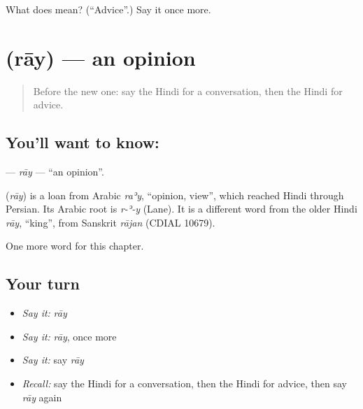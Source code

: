 \begin{tcolorbox}[breakable,colback=teal!4,colframe=teal!35!black,title={Before you move on}]
What does  mean? (\textquotedblleft{}Advice\textquotedblright{}.) Say it once more.
\end{tcolorbox}
\section[\texorpdfstring{\hi{राय} (rāy)}{राय (rāy)}]{ (rāy) — an opinion}

\label{lesson:HI-C206-ray}



\begin{quote}
Before the new one: say the Hindi for a conversation, then the Hindi for advice.
\end{quote}

\subsection*{You'll want to know: }
\textbf{} — \emph{rāy} — \textquotedblleft{}an opinion\textquotedblright{}.

\begin{cousinweb}
\textbf{} (\emph{rāy}) is a loan from Arabic \emph{raʾy}, \textquotedblleft{}opinion, view\textquotedblright{}, which reached Hindi through Persian. Its Arabic root is \emph{r-ʾ-y} (Lane). It is a different word from the older Hindi \emph{rāy}, \textquotedblleft{}king\textquotedblright{}, from Sanskrit \emph{rājan} (CDIAL 10679).
\end{cousinweb}

\begin{grammarlens}[title={What you've built}]
One more word for this chapter.
\end{grammarlens}

\subsection*{Your turn}
\begin{itemize}
\raggedright
  \item \emph{Say it:} \emph{rāy}
  \item \emph{Say it:} \emph{rāy}, once more
  \item \emph{Say it:} say \emph{rāy}
  \item \emph{Recall:} say the Hindi for a conversation, then the Hindi for advice, then say \emph{rāy} again
\end{itemize}

